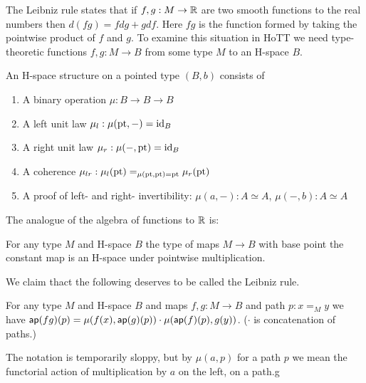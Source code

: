 \documentclass[12pt]{article}
\begin{document}
The Leibniz rule states that if \( f, g:M\to \mathbb{R} \) are two smooth functions to the real numbers then \( d(fg) = fdg + gdf \). Here \( fg \) is the function formed by taking the pointwise product of \( f \) and \( g \). To examine this situation in HoTT we need type-theoretic functions \( f, g:M\to B \) from some type \( M \) to an H-space \( B \).

\begin{mydef}
An H-space structure on a pointed type \( (B,b) \) consists of
\begin{enumerate}
\item A binary operation \( \mu:B\to B\to B \)
\item A left unit law \( \mu_l:\mu(\mathrm{pt},-)=\text{id}_B \)
\item A right unit law \( \mu_r:\mu(-,\mathrm{pt})=\text{id}_B \)
\item A coherence \( \mu_{lr}:\mu_l(\mathrm{pt})=_{\mu(\mathrm{pt},\mathrm{pt})=\mathrm{pt}}\mu_r(\mathrm{pt}) \)
\item A proof of left- and right- invertibility: \( \mu(a,-):A\simeq A \), \( \mu(-, b):A\simeq A \)
\end{enumerate}
\end{mydef}

The analogue of the algebra of functions to \( \mathbb{R} \) is:
\begin{myprop}
For any type \( M \) and H-space \( B \) the type of maps \( M\to B \) with base point the constant map is an H-space under pointwise multiplication.
\end{myprop}

We claim thact the following deserves to be called the Leibniz rule.

\begin{mylemma}
For any type \( M \) and H-space \( B \) and maps \( f,g:M\to B \) and path \( p:x=_M y \) we have \( \textsf{ap}(fg)(p)=\mu(f(x),\textsf{ap}(g)(p)) \cdot \mu(\textsf{ap}(f)(p),g(y)) \). (\( \cdot \) is concatenation of paths.)
\end{mylemma}

The notation is temporarily sloppy, but by \( \mu(a, p) \) for a path \( p \) we mean the functorial action of multiplication by \( a \) on the left, on a path.g

\end{document}

